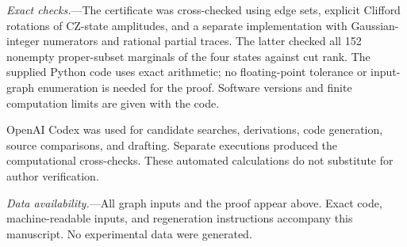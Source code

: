 \documentclass[aps,pra,reprint,amsmath,amssymb,longbibliography]{revtex4-2}
\begin{document}
\emph{Exact checks.}---The certificate was cross-checked using edge sets, explicit Clifford rotations of CZ-state amplitudes, and a separate implementation with Gaussian-integer numerators and rational partial traces. The latter checked all 152 nonempty proper-subset marginals of the four states against cut rank. The supplied Python code uses exact arithmetic; no floating-point tolerance or input-graph enumeration is needed for the proof. Software versions and finite computation limits are given with the code.

OpenAI Codex was used for candidate searches, derivations, code generation, source comparisons, and drafting. Separate executions produced the computational cross-checks. These automated calculations do not substitute for author verification.

\emph{Data availability.}---All graph inputs and the proof appear above. Exact code, machine-readable inputs, and regeneration instructions accompany this manuscript. No experimental data were generated.


\end{document}
